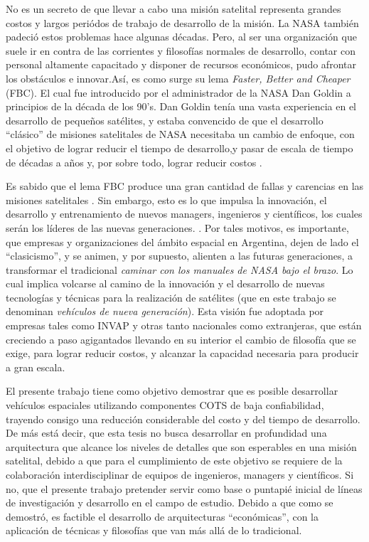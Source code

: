 No es un secreto de que llevar a cabo una misión satelital representa grandes costos
y largos periódos de trabajo de desarrollo de la misión.
La NASA también padeció estos problemas hace algunas décadas.
Pero, al ser una organización que suele ir en contra de las corrientes y filosofías
normales de desarrollo, contar con personal altamente capacitado y disponer de recursos
económicos, pudo afrontar los obstáculos e innovar.Así, es como
surge su lema \textit{Faster, Better and Cheaper} (FBC).
El cual fue introducido por el administrador de la NASA Dan Goldin a
principios de la década de los 90's. Dan Goldin tenía una vasta experiencia en
el desarrollo de pequeños satélites, y estaba convencido de que el desarrollo
``clásico'' de misiones satelitales de NASA necesitaba un cambio de enfoque,
con el objetivo de lograr reducir el tiempo de desarrollo,y pasar de escala de tiempo de
décadas a años y, por sobre todo, lograr reducir costos \citep{Paxton07}.

Es sabido que el lema FBC produce una gran cantidad de fallas y
carencias en las misiones satelitales \citep{Paxton07}. Sin embargo,
esto es lo que impulsa la innovación, el desarrollo y entrenamiento de nuevos
managers, ingenieros y científicos, los cuales serán los líderes de las
nuevas generaciones. \citep{Paxton07}. Por tales motivos, es importante,
que empresas y organizaciones del ámbito espacial en Argentina, dejen
de lado el ``clasicismo'', y se animen, y por supuesto, alienten a las futuras
generaciones, a transformar el tradicional \textit{caminar con los manuales de NASA bajo
  el brazo}. Lo cual implica volcarse al camino de la   innovación y el desarrollo
de nuevas tecnologías y técnicas para la realización de satélites (que en este trabajo se denominan
\textit{vehículos de nueva generación}). Esta visión fue adoptada por empresas tales como INVAP
y otras tanto nacionales como extranjeras,  que están creciendo a paso agigantados llevando
en su interior el cambio de filosofía que se exige, para lograr reducir costos, y 
alcanzar la capacidad necesaria para producir a gran escala.

El presente  trabajo tiene como objetivo demostrar que es posible desarrollar
vehículos espaciales utilizando componentes COTS de baja confiabilidad, trayendo
consigo una reducción considerable del costo y del tiempo de desarrollo. De más está
decir, que esta tesis no busca desarrollar en profundidad una arquitectura
que alcance los niveles de detalles que son esperables en una misión satelital, debido a que para
el cumplimiento de este objetivo se requiere de la colaboración interdisciplinar de equipos de 
ingenieros, managers y científicos. Si no, que el presente trabajo pretender servir como
base o puntapié inicial de líneas de investigación y desarrollo en el campo de estudio.
Debido a que como se demostró, es factible el desarrollo de arquitecturas
``económicas'', con la aplicación de técnicas y filosofías que van más allá de lo tradicional.

